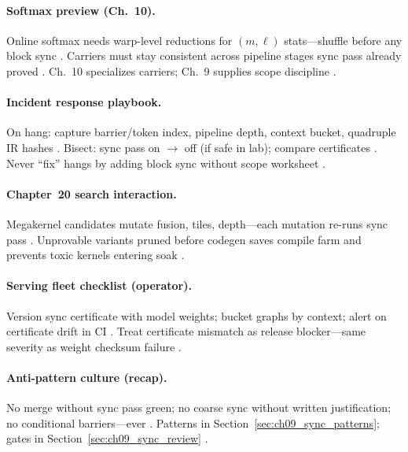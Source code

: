 \paragraph{Softmax preview (Ch.~10).}
Online softmax needs warp-level reductions for $(m,\ell)$ stats---shuffle before any block sync \citep{dao2022flashattention,shah2024flashattention3,memoryfloor2026}.
Carriers must stay consistent across pipeline stages sync pass already proved \citep{yirage2026,patel2025llminference,semianalysis2024tma}.
Ch.~10 specializes carriers; Ch.~9 supplies scope discipline \citep{dao2022flashattention,chen2020compilerbasedhardw}.

\paragraph{Incident response playbook.}
On hang: capture barrier/token index, pipeline depth, context bucket, quadruple IR hashes \citep{taxbreak2026,shah2024flashattention3,yirage2026,mpk2025}.
Bisect: sync pass on $\rightarrow$ off (if safe in lab); compare certificates \citep{wu2024mirage,chen2020compilerbasedhardw,semianalysis2024tma}.
Never ``fix'' hangs by adding block sync without scope worksheet \citep{patel2025llminference,memoryfloor2026,taxbreak2026}.

\paragraph{Chapter~20 search interaction.}
Megakernel candidates mutate fusion, tiles, depth---each mutation re-runs sync pass \citep{mpk2025,wu2024mirage,yirage2026}.
Unprovable variants pruned before codegen saves compile farm and prevents toxic kernels entering soak \citep{chen2020compilerbasedhardw,taxbreak2026,patel2025llminference}.

\paragraph{Serving fleet checklist (operator).}
Version sync certificate with model weights; bucket graphs by context; alert on certificate drift in CI \citep{nvidia2024cudagraphs,kwon2023vllm,yirage2026,shah2024flashattention3}.
Treat certificate mismatch as release blocker---same severity as weight checksum failure \citep{taxbreak2026,mpk2025,chen2020compilerbasedhardw}.

\paragraph{Anti-pattern culture (recap).}
No merge without sync pass green; no coarse sync without written justification; no conditional barriers---ever \citep{yirage2026,shah2024flashattention3,nvidia2022hopper,semianalysis2024tma}.
Patterns in Section~\ref{sec:ch09_sync_patterns}; gates in Section~\ref{sec:ch09_sync_review} \citep{chen2020compilerbasedhardw,taxbreak2026,patel2025llminference}.

